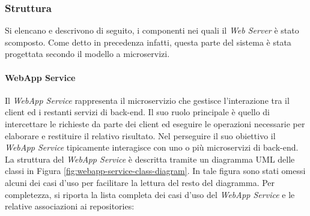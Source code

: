 \subsubsection{Struttura}
Si elencano e descrivono di seguito, i componenti nei quali il \textit{Web Server} è stato scomposto. Come detto in precedenza infatti, questa parte del sistema è stata progettata secondo il modello a microservizi. 

\paragraph{WebApp Service}
Il \textit{WebApp Service} rappresenta il microservizio che gestisce l'interazione tra il client ed i restanti servizi di back-end. Il suo ruolo principale è quello di intercettare le richieste da parte dei client ed eseguire le operazioni necessarie per elaborare e restituire il relativo risultato. Nel perseguire il suo obiettivo il \textit{WebApp Service} tipicamente interagisce con uno o più microservizi di back-end.
La struttura del \textit{WebApp Service} è descritta tramite un diagramma UML delle classi in Figura \ref{fig:webapp-service-class-diagram}. In tale figura sono stati omessi alcuni dei casi d'uso per facilitare la lettura del resto del diagramma. Per completezza, si riporta la lista completa dei casi d'uso del \textit{WebApp Service} e le relative associazioni ai repositories:
